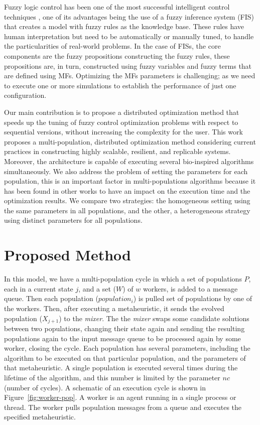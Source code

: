 \documentclass[runningheads]{llncs}
\begin{document}
Fuzzy logic control has been one of the most successful intelligent control
techniques \cite{Driankov2013Fuzzy},  one of its advantages being the use of a fuzzy
inference system (FIS) that creates a model with fuzzy rules as the
knowledge base. These rules have human interpretation but need to be
automatically or manually tuned, to handle the particularities of real-world
problems. In the case of FISs, the core components are the fuzzy propositions
constructing the fuzzy rules, these propositions are, in turn, constructed
using fuzzy variables and fuzzy terms that are defined using MFs. Optimizing
the MFs parameters is challenging; as we need to execute one or more
simulations to establish the performance of just one configuration.

Our main contribution is to propose a distributed optimization method that
speeds up the tuning of fuzzy control optimization problems with respect to
sequential versions, without increasing the complexity for the user. This work
proposes a multi-population, distributed optimization method considering
current practices in constructing highly scalable, resilient, and replicable
systems. Moreover, the architecture is capable of executing several
bio-inspired algorithms simultaneously. We also address the problem of setting
the parameters for each population, this is an important factor in
multi-populations algorithms because it has been found in other works to have
an impact on the execution time and the optimization results. We compare two
strategies: the homogeneous setting using the same parameters in all
populations, and the other, a heterogeneous strategy using distinct parameters
for all populations.

\section{Proposed Method}

In this model, we have a  multi-population cycle in which a set of populations
$P$, each in a current state $j$, and a set ($W$) of $w$ workers, is added to a
message queue. Then each population ($population_{i}$) is pulled set of
populations by one of the workers. Then, after executing a metaheuristic, it
sends the evolved population ($X_{j+1}$) to the \emph{mixer}. The the
\emph{mixer} swaps some candidate solutions between two populations, changing
their state again and sending the resulting populations again to the input
message queue to be processed again by some worker, closing the cycle. Each
population has several parameters, including the algorithm to be executed on
that particular population, and the parameters of that metaheuristic. A single
population is executed several times during the lifetime of the algorithm, and
this number is limited by the parameter $nc$ (number of cycles).  A schematic
of an execution cycle is shown in Figure~\ref{fig:worker-pop}. A worker is an
agent running in a single process or thread. The worker pulls population
messages from a queue and executes the specified metaheuristic.
\end{document}
